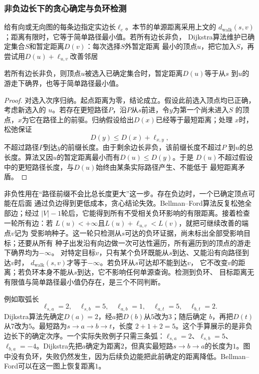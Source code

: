 \subsubsection{非负边长下的贪心确定与负环检测}

给有向或无向图的每条边指定实边长\(\ell_e\)。本节的单源距离采用上文的
\(d_{\mathrm{walk}}(s,v)\)；距离有限时，它等于简单路径最小值。若所有边长非负，
Dijkstra算法维护已确定集合\(S\)和暂定距离\(D(v)\)：每次选择\(S\)外暂定距离
最小的顶点\(u\)，把它加入\(S\)，再尝试用\(D(u)+\ell_{u,v}\)改善邻居

\begin{theorem}[Dijkstra算法的贪心正确性]
  \label{thm:graph-theory-dijkstra-correctness}
  若所有边长非负，则顶点\(u\)被选入已确定集合时，暂定距离\(D(u)\)等于从\(s\)
  到\(u\)的游走下确界，也等于简单路径最小值。
\end{theorem}

\begin{proof}
对选入次序归纳。起点距离为零，结论成立。假设此前选入顶点均已正确，考虑新选入的
\(u\)。若存在更短路径\(P\)，沿\(P\)从\(s\)前进，令\(y\)为第一个尚未进入\(S\)
的顶点，\(x\)为它在路径上的前驱。归纳假设给出\(D(x)\)已经等于最短距离；处理
\(x\)时，松弛保证
\[
  D(y)\leq D(x)+\ell_{x,y},
\]
不超过路径\(P\)到达\(y\)的前缀长度。由于剩余边长非负，该前缀长度不超过\(P\)
到\(u\)的总长度。算法又因\(u\)的暂定距离最小而有\(D(u)\leq D(y)\)。于是
\(D(u)\)不超过假设中的更短路径长度，与\(D(u)\)始终由某条实际路径产生、不能低于
最短距离矛盾。
\end{proof}

非负性用在“路径前缀不会比总长度更大”这一步。存在负边时，一个已确定顶点可能在后面
通过负边得到更低成本，贪心结论失效。Bellman--Ford算法反复松弛全部边；经过
\(|V|-1\)轮后，它能得到所有不受相关负环影响的有限距离。接着检查一轮所有边：若
\(L(u)<+\infty\)且\(L(u)+\ell_{u,v}<L(v)\)，就把可继续改善的端点\(v\)记为
受影响种子。这一轮只检测从\(s\)可达的负环证据，尚未标出全部受影响目标；还要从所有
种子出发沿有向边做一次可达性遍历，所有遍历到的顶点的游走下确界均为\(-\infty\)。
对特定目标\(v\)，只有某个负环既能从\(s\)到达、又能沿有向路径到达\(v\)时，
\(d_{\mathrm{walk}}(s,v)\)才等于\(-\infty\)。若负环从\(s\)可达却不能到达\(v\)，
它不改变\(v\)的距离；若负环本身不能从\(s\)到达，它不影响任何单源查询。检测到负环、
目标距离无有限值与简单路径最小值仍存在，是三个不同判断。

例如取弧长
\[
  \ell_{s,a}=2,\quad \ell_{s,b}=5,\quad
  \ell_{a,b}=1,\quad \ell_{a,t}=5,\quad \ell_{b,t}=2.
\]
Dijkstra算法先确定\(D(a)=2\)，经\(a\)把\(D(b)\)从\(5\)改为\(3\)；随后确定
\(b\)，再把\(D(t)\)从\(7\)改为\(5\)。最短路为\(s\to a\to b\to t\)，长度
\(2+1+2=5\)。这个手算展示的是非负边长下的确定次序。一个实际失败例子只需三条弧：\(\ell_{s,a}=2\)、\(\ell_{s,b}=5\)、\(\ell_{b,a}=-4\)。Dijkstra先把\(a\)确定为距离\(2\)，但真实最短路\(s\to b\to a\)的长度为\(1\)。图中没有负环，失败仍然发生，因为后续负边能把此前确定的距离降低。Bellman--Ford可以在这一图上恢复距离\(1\)。

